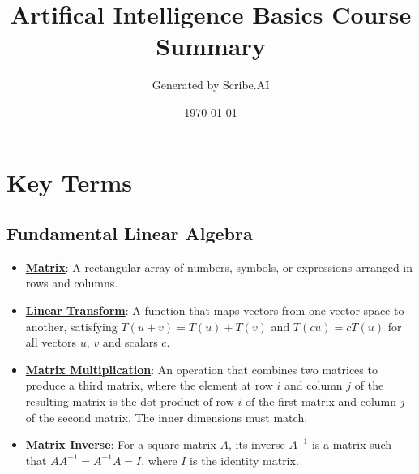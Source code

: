 \documentclass{article}%
\title{Artifical Intelligence Basics Course Summary}%
\author{Generated by Scribe.AI}%
\date{\today}%
\begin{document}
%
\normalsize%
\maketitle%
\section{Key Terms}%
\label{sec:KeyTerms}%
\subsection{Fundamental Linear Algebra}%
\label{subsec:FundamentalLinearAlgebra}%
\begin{itemize}[leftmargin=*]%
\item \href{https://purdue.brightspace.com/d2l/common/assets/pdfjs-d2l-dist/1.0.14-legacy/web/viewer.html?file=\%2Fcontent\%2Fenforced\%2F1095467-wl.202510.CS.24300.001\%2F04L1-Linear Algebra Primer.pdf\%3Fou\%3D1095467\&lang=en-us\&container=d2l-fileviewer-rendered-pdf\&fullscreen=d2l-fileviewer-rendered-pdf-dialog\&height=667#page=4}{\textbf{Matrix}}: A rectangular array of numbers, symbols, or expressions arranged in rows and columns.%
\item \href{https://purdue.brightspace.com/d2l/common/assets/pdfjs-d2l-dist/1.0.14-legacy/web/viewer.html?file=\%2Fcontent\%2Fenforced\%2F1095467-wl.202510.CS.24300.001\%2F04L1-Linear Algebra Primer.pdf\%3Fou\%3D1095467\&lang=en-us\&container=d2l-fileviewer-rendered-pdf\&fullscreen=d2l-fileviewer-rendered-pdf-dialog\&height=667#page=5}{\textbf{Linear Transform}}: A function that maps vectors from one vector space to another, satisfying $T(u + v) = T(u) + T(v)$ and $T(cu) = cT(u)$ for all vectors $u$, $v$ and scalars $c$.%
\item \href{https://purdue.brightspace.com/d2l/common/assets/pdfjs-d2l-dist/1.0.14-legacy/web/viewer.html?file=\%2Fcontent\%2Fenforced\%2F1095467-wl.202510.CS.24300.001\%2F04L1-Linear Algebra Primer.pdf\%3Fou\%3D1095467\&lang=en-us\&container=d2l-fileviewer-rendered-pdf\&fullscreen=d2l-fileviewer-rendered-pdf-dialog\&height=667#page=14}{\textbf{Matrix Multiplication}}: An operation that combines two matrices to produce a third matrix, where the element at row $i$ and column $j$ of the resulting matrix is the dot product of row $i$ of the first matrix and column $j$ of the second matrix. The inner dimensions must match.%
\item \href{https://purdue.brightspace.com/d2l/common/assets/pdfjs-d2l-dist/1.0.14-legacy/web/viewer.html?file=\%2Fcontent\%2Fenforced\%2F1095467-wl.202510.CS.24300.001\%2F04L1-Linear Algebra Primer.pdf\%3Fou\%3D1095467\&lang=en-us\&container=d2l-fileviewer-rendered-pdf\&fullscreen=d2l-fileviewer-rendered-pdf-dialog\&height=667#page=10}{\textbf{Matrix Inverse}}: For a square matrix $A$, its inverse $A^{-1}$ is a matrix such that $AA^{-1} = A^{-1}A = I$, where $I$ is the identity matrix.%

\end{itemize}
\end{document}
